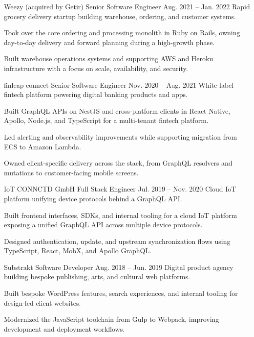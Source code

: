 \ResumeJob
  {Weezy (acquired by Getir)}
  {Senior Software Engineer}
  {Aug. 2021 -- Jan. 2022}
  {Rapid grocery delivery startup building warehouse, ordering, and customer systems.}
\begin{ResumeList}
  \item Took over the core ordering and processing monolith in Ruby on Rails, owning day-to-day delivery and forward planning during a high-growth phase.
  \item Built warehouse operations systems and supporting AWS and Heroku infrastructure with a focus on scale, availability, and security.
\end{ResumeList}

\ResumeJob
  {finleap connect}
  {Senior Software Engineer}
  {Nov. 2020 -- Aug. 2021}
  {White-label fintech platform powering digital banking products and apps.}
\begin{ResumeList}
  \item Built GraphQL APIs on NestJS and cross-platform clients in React Native, Apollo, Node.js, and TypeScript for a multi-tenant fintech platform.
  \item Led alerting and observability improvements while supporting migration from ECS to Amazon Lambda.
  \item Owned client-specific delivery across the stack, from GraphQL resolvers and mutations to customer-facing mobile screens.
\end{ResumeList}

\newpage

\ResumeJob
  {IoT CONNCTD GmbH}
  {Full Stack Engineer}
  {Jul. 2019 -- Nov. 2020}
  {Cloud IoT platform unifying device protocols behind a GraphQL API.}
\begin{ResumeList}
  \item Built frontend interfaces, SDKs, and internal tooling for a cloud IoT platform exposing a unified GraphQL API across multiple device protocols.
  \item Designed authentication, update, and upstream synchronization flows using TypeScript, React, MobX, and Apollo GraphQL.
\end{ResumeList}

\ResumeJob
  {Substrakt}
  {Software Developer}
  {Aug. 2018 -- Jun. 2019}
  {Digital product agency building bespoke publishing, arts, and cultural web platforms.}
\begin{ResumeList}
  \item Built bespoke WordPress features, search experiences, and internal tooling for design-led client websites.
  \item Modernized the JavaScript toolchain from Gulp to Webpack, improving development and deployment workflows.
\end{ResumeList}

